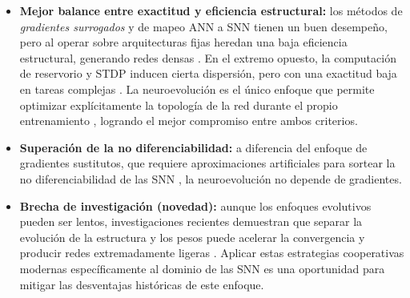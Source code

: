 \begin{itemize}
    \item \textbf{Mejor balance entre exactitud y eficiencia estructural:} los métodos de \textit{gradientes surrogados} y de mapeo ANN a SNN tienen un buen desempeño, pero al operar sobre arquitecturas fijas heredan una baja eficiencia estructural, generando redes densas \cite{Schuman2022Opportunities, deng2021optimal}. En el extremo opuesto, la computación de reservorio y STDP inducen cierta dispersión, pero con una exactitud baja en tareas complejas \cite{Duran2025CMOSSNNReservoir, Liu2021SSTDP}. La neuroevolución es el único enfoque que permite optimizar explícitamente la topología de la red durante el propio entrenamiento \cite{risi2025neuroevolution}, logrando el mejor compromiso entre ambos criterios.


    \item \textbf{Superación de la no diferenciabilidad:} a diferencia del enfoque de gradientes sustitutos, que requiere aproximaciones artificiales para sortear la no diferenciabilidad de las SNN \cite{Neftci2019SurrogateGradient}, la neuroevolución no depende de gradientes.


    \item \textbf{Brecha de investigación (novedad):} aunque los enfoques evolutivos pueden ser lentos, investigaciones recientes \cite{MOEA/CKF} demuestran que separar la evolución de la estructura y los pesos puede acelerar la convergencia y producir redes extremadamente ligeras \cite{MOEA/CKF, Yue2025CNEA}. Aplicar estas estrategias cooperativas modernas específicamente al dominio de las SNN es una oportunidad para mitigar las desventajas históricas de este enfoque.
\end{itemize}


